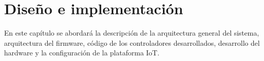 
\chapter{Diseño e implementación} %
En este capítulo se abordará la descripción de la arquitectura general del sistema, arquitectura del firmware, código de los controladores desarrollados, desarrollo del hardware y la configuración de la plataforma IoT.
\label{Chapter3} %

